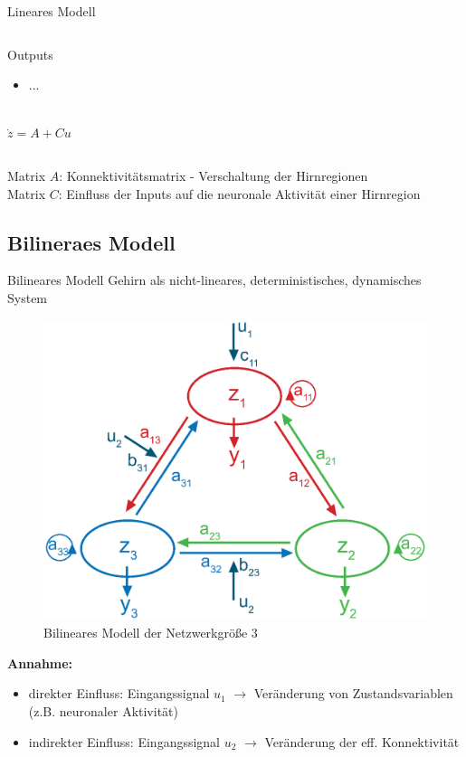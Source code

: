 \documentclass{beamer}
\begin{document}
\begin{frame}{Lineares Modell}
\begin{columns}
\begin{center}
{\begin{minipage}{\textwidth}
\begin{block}{Outputs}
\begin{itemize}
						\item ...
						\end{itemize}
					\end{block}
					\end{minipage}
				}\\
				\vspace{0.5cm}
				$\dot{z}=A+Cu$ 
			\end{center}
		\end{columns}	
		\vspace{0.5cm}
		{\small Matrix $A$: Konnektivitätsmatrix - Verschaltung der Hirnregionen} \\
		{\small Matrix $C$: Einfluss der Inputs auf die neuronale Aktivität einer Hirnregion}
	\end{frame}
	
\subsection{Bilineraes Modell}
	\begin{frame}{Bilineares Modell}
		Gehirn als nicht-lineares, deterministisches, dynamisches System 
		\begin{figure}[H]
			\centering
			\label{fig: bilinearesModell}
			\includegraphics[scale=0.4]{res/bilinearesModell_bunt.eps}
			\caption{Bilineares Modell der Netzwerkgröße 3}
		\end{figure}		
			
		\textbf{Annahme:}
		\begin{itemize}
			\item direkter Einfluss: Eingangssignal $ u_1 $ $ \rightarrow $ Veränderung von Zustandsvariablen (z.B. neuronaler Aktivität)
			\item indirekter Einfluss: Eingangssignal $ u_2 $ $ \rightarrow $ Veränderung der eff. Konnektivität
		\end{itemize}
			
	\end{frame}
	
\end{document}
